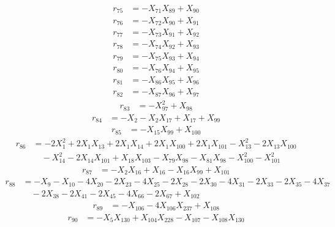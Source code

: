 \begin{align*}
r_{75}&=-X_{71}X_{89}+X_{90}
\end{align*}
\begin{align*}
r_{76}&=-X_{72}X_{90}+X_{91}
\end{align*}
\begin{align*}
r_{77}&=-X_{73}X_{91}+X_{92}
\end{align*}
\begin{align*}
r_{78}&=-X_{74}X_{92}+X_{93}
\end{align*}
\begin{align*}
r_{79}&=-X_{75}X_{93}+X_{94}
\end{align*}
\begin{align*}
r_{80}&=-X_{76}X_{94}+X_{95}
\end{align*}
\begin{align*}
r_{81}&=-X_{86}X_{95}+X_{96}
\end{align*}
\begin{align*}
r_{82}&=-X_{87}X_{96}+X_{97}
\end{align*}
\begin{align*}
r_{83}&=-X_{97}^{2}+X_{98}
\end{align*}
\begin{align*}
r_{84}&=-X_{2}-X_{2}X_{17}+X_{17}+X_{99}
\end{align*}
\begin{align*}
r_{85}&=-X_{15}X_{99}+X_{100}
\end{align*}
\begin{align*}
r_{86}&=-2X_{1}^{2}+2X_{1}X_{13}+2X_{1}X_{14}+2X_{1}X_{100}+2X_{1}X_{101}-X_{13}^{2}-2X_{13}X_{100}\\
&\quad -X_{14}^{2}-2X_{14}X_{101}+X_{18}X_{103}-X_{79}X_{98}-X_{81}X_{98}-X_{100}^{2}-X_{101}^{2}
\end{align*}
\begin{align*}
r_{87}&=-X_{2}X_{16}+X_{16}-X_{16}X_{99}+X_{101}
\end{align*}
\begin{align*}
r_{88}&=-X_{9}-X_{10}-4X_{20}-2X_{23}-4X_{25}-2X_{28}-2X_{30}-4X_{31}-2X_{33}-2X_{35}-4X_{37}\\
&\quad -2X_{38}-2X_{41}-2X_{45}-4X_{66}-2X_{67}+X_{102}
\end{align*}
\begin{align*}
r_{89}&=-X_{106}-4X_{106}X_{237}+X_{108}
\end{align*}
\begin{align*}
r_{90}&=-X_{5}X_{130}+X_{104}X_{228}-X_{107}-X_{108}X_{130}
\end{align*}

